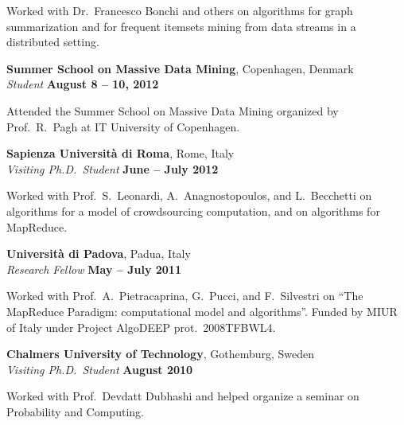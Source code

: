 \documentclass[margin,line]{resume}
\begin{document}
\begin{list2}
\vspace*{.05in}
\item Worked with Dr.~Francesco Bonchi and others on algorithms for graph
  summarization and for frequent itemsets mining from data streams in a
  distributed setting.
\end{list2}

{\bf Summer School on Massive Data Mining}, Copenhagen, Denmark \\
{\em Student} \hfill {\bf August 8 -- 10, 2012}

\begin{list2}
  \vspace*{.05in}
\item Attended the Summer School on Massive Data Mining organized by
  Prof.~R.~Pagh at IT University of Copenhagen.
\end{list2}

\pagebreak
{\bf Sapienza Universit\`a di Roma}, Rome, Italy\\
{\em Visiting Ph.D.~Student} \hfill {\bf June -- July 2012}

\begin{list2}
\vspace*{.05in}
\item Worked with Prof.~S.~Leonardi, A.~Anagnostopoulos, and L.~Becchetti on
  algorithms for a model of crowdsourcing computation, and on algorithms for
  MapReduce.
\end{list2}

{\bf Universit\`a di Padova}, Padua, Italy\\
{\em Research Fellow} \hfill {\bf May -- July 2011}

\begin{list2}
\vspace*{.05in}
\item Worked with Prof.~A.~Pietracaprina, G.~Pucci, and F.~Silvestri on ``The MapReduce Paradigm:
computational model and algorithms''. Funded by MIUR of Italy under Project AlgoDEEP prot.~2008TFBWL4.
\end{list2}

{\bf Chalmers University of Technology}, Gothemburg, Sweden\\
{\em Visiting Ph.D.~Student} \hfill {\bf August 2010}

\begin{list2}
\vspace*{.05in}
\item Worked with Prof.~Devdatt Dubhashi and helped organize a seminar on Probability and Computing.
\end{list2}
\end{document}
